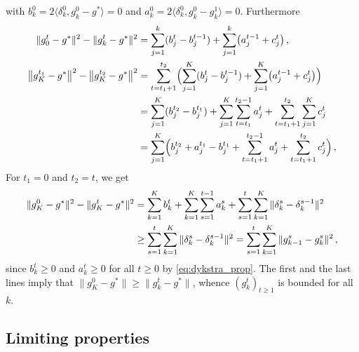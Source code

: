 \documentclass[a4paper]{article}
\begin{document}
with $b^0_k = 2 \langle \delta^0_k, g^0_k - g^* \rangle = 0$ and $a^0_k = 2 \langle
\delta^0_k, g^0_k - g^1_k\rangle = 0$. Furthermore
\begin{align}
  \|g^t_0 - g^*\|^2 - \|g^t_k - g^*\|^2
    &= \sum_{j=1}^k (b^t_j - b^{t-1}_j)
      + \sum_{j=1}^k \bigl( a^{t-1}_j + c^t_j \bigr)
    \,, \label{eq:t0k_norm} \\
  \bigl \| g^{t_1}_K - g^* \bigr \|^2 - \bigl \| g^{t_2}_K - g^* \bigr \|^2
    &= \sum_{t=t_1+1}^{t_2} \Bigl(
        \sum_{j=1}^K (b^t_j - b^{t-1}_j)
          + \sum_{j=1}^K \bigl( a^{t-1}_j + c^t_j \bigr)
        \Bigr)
      \notag \\
    &= \sum_{j=1}^K (b^{t_2}_j - b^{t_1}_j)
        + \sum_{j=1}^K \sum_{t=t_1}^{t_2-1} a^t_j
        + \sum_{t=t_1+1}^{t_2} \sum_{j=1}^K c^t_j
      \notag \\
    &= \sum_{j=1}^K \Bigl( b^{t_2}_j + a^{t_1}_j - b^{t_1}_j
          + \sum_{t=t_1+1}^{t_2-1} a^t_j + \sum_{t=t_1+1}^{t_2} c^t_j
      \Bigr)
    \,, \label{eq:t1t2K_norm}
\end{align}
For $t_1 = 0$ and $t_2 = t$, we get
\begin{align}
  \|g^0_K - g^*\|^2 - \|g^t_K - g^*\|^2
    &= \sum_{k=1}^K b^t_k
        + \sum_{k=1}^K \sum_{s=1}^{t-1} a^s_k
        + \sum_{s=1}^t \sum_{k=1}^K \| \delta^s_k - \delta^{s-1}_k \|^2
      \notag \\
    &\geq
      \sum_{s=1}^t \sum_{k=1}^K \| \delta^s_k - \delta^{s-1}_k \|^2
    = \sum_{s=1}^t \sum_{k=1}^K \| g^s_{k-1} - g^s_k \|^2
    \,, \label{eq:gtk_bound}
\end{align}
since $b^t_k \geq 0$ and $a^t_k \geq 0$ for all $t\geq 0$ by \eqref{eq:dykstra_prop}.
The first and the last lines imply that $\|g^0_K - g^*\| \geq \|g^t_k - g^*\|$, whence
$(g^t_k)_{t\geq1}$ is bounded for all $k$.


\subsection*{Limiting properties} %
\label{sub:limiting_properties}
\end{document}

